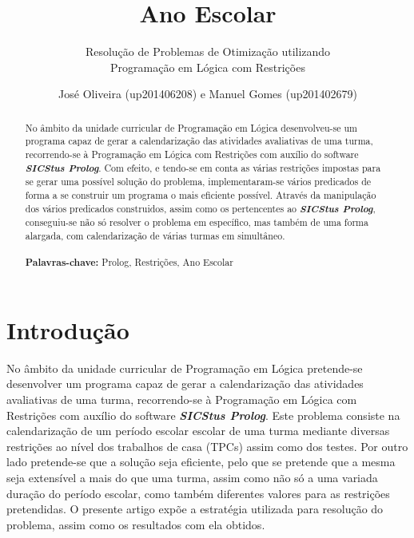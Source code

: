 \documentclass{llncs}
\begin{document}
%
\frontmatter          %
%
\pagestyle{headings}  %
%
\title{Ano Escolar}
\subtitle{Resolução de Problemas de Otimização utilizando\\
Programação em Lógica com Restrições}
%
%
%
%
\author{José Oliveira (up201406208) e Manuel Gomes (up201402679)}
%

\maketitle              %

\begin{abstract} %
No âmbito da unidade curricular de Programação em Lógica desenvolveu-se um programa capaz de gerar a calendarização das atividades avaliativas de uma turma, recorrendo-se à Programação em Lógica com Restrições com auxílio do software \textbf{\textit{SICStus Prolog}}.
Com efeito, e tendo-se em conta as várias restrições impostas para se gerar uma possível solução do problema, implementaram-se vários predicados de forma a se construir um programa o mais eficiente possível.
Através da manipulação dos vários predicados construidos, assim como os pertencentes ao \textbf{\textit{SICStus Prolog}}, conseguiu-se não só resolver o problema em específico, mas também de uma forma alargada, com calendarização de várias turmas em simultâneo.
\\\\
\textbf{Palavras-chave: }Prolog, Restrições, Ano Escolar

\end{abstract}
%
\section{Introdução}
No âmbito da unidade curricular de Programação em Lógica pretende-se desenvolver um programa capaz de gerar a calendarização das atividades avaliativas de uma turma, recorrendo-se à Programação em Lógica com Restrições com auxílio do software \textbf{\textit{SICStus Prolog}}.
Este problema consiste na calendarização de um período escolar escolar de uma turma mediante diversas restrições ao nível dos trabalhos de casa (TPCs) assim como dos testes. Por outro lado pretende-se que a solução seja eficiente, pelo que se pretende que a mesma seja extensível a mais do que uma turma, assim como não só a uma variada duração do período escolar, como também diferentes valores para as restrições pretendidas. 
O presente artigo expõe a estratégia utilizada para resolução do problema, assim como os resultados com ela obtidos.
\end{document}
